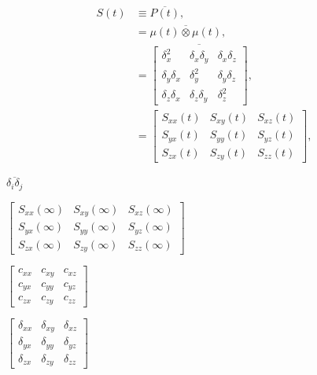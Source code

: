 \documentclass[a4paper,11pt,twoside,openright]{book}
\def\lthtmlcheckvsize{\ifdim\ht\sizebox<\vsize 
  \ifdim\wd\sizebox<\hsize\expandafter\hfill\fi \expandafter\vfill
  \else\expandafter\vss\fi}%
\begin{document}
{\newpage\clearpage
\setcounter{equation}{3}
%
\begin{subequations}\begin{align}
S(t)
&\equiv \overline{P(t)} , \\
&= \overline{\mu(t) \otimes \mu(t)} ,\\
&= \overline{\begin{bmatrix}
\delta_x^2       & \delta_x\delta_y & \delta_x\delta_z \\
\delta_y\delta_x & \delta_y^2       & \delta_y\delta_z \\
\delta_z\delta_x & \delta_z\delta_y & \delta_z^2
\end{bmatrix}} ,\\
&= \begin{bmatrix}
S_{xx}(t) & S_{xy}(t) & S_{xz}(t) \\
S_{yx}(t) & S_{yy}(t) & S_{yz}(t) \\
S_{zx}(t) & S_{zy}(t) & S_{zz}(t)
\end{bmatrix} ,\end{align}\end{subequations}%
\lthtmldisplayZ
\lthtmlcheckvsize\clearpage}

{\newpage\clearpage
{}%
$\displaystyle \overline{{\delta_i \delta_j}}$%
\lthtmlindisplaymathZ
\lthtmlcheckvsize\clearpage}

{\newpage\clearpage
{}%
$\displaystyle \begin{bmatrix}
S_{xx}(\infty) & S_{xy}(\infty) & S_{xz}(\infty) \\
S_{yx}(\infty) & S_{yy}(\infty) & S_{yz}(\infty) \\
S_{zx}(\infty) & S_{zy}(\infty) & S_{zz}(\infty)
\end{bmatrix}$%
\lthtmlindisplaymathZ
\lthtmlcheckvsize\clearpage}

{\newpage\clearpage
{}%
$\displaystyle \begin{bmatrix}
c_{xx} & c_{xy} & c_{xz} \\
c_{yx} & c_{yy} & c_{yz} \\
c_{zx} & c_{zy} & c_{zz}
\end{bmatrix}$%
\lthtmlindisplaymathZ
\lthtmlcheckvsize\clearpage}

{\newpage\clearpage
{}%
$\displaystyle \begin{bmatrix}
\delta_{xx} & \delta_{xy} & \delta_{xz} \\
\delta_{yx} & \delta_{yy} & \delta_{yz} \\
\delta_{zx} & \delta_{zy} & \delta_{zz}
\end{bmatrix}$%
\lthtmlindisplaymathZ
\lthtmlcheckvsize\clearpage}
\end{document}
